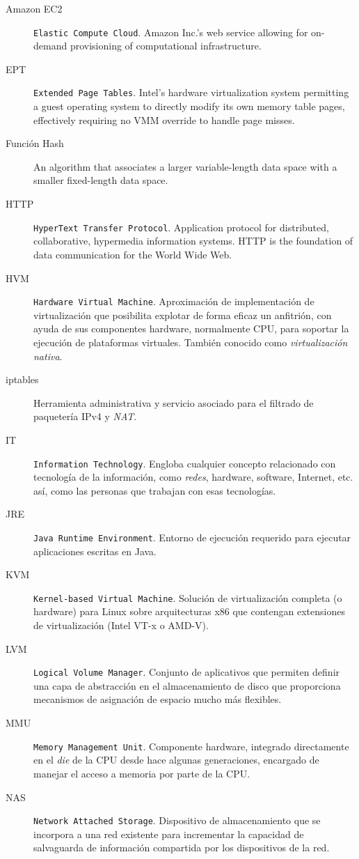 \begin{description}
\item[Amazon EC2] \texttt{Elastic Compute Cloud}. Amazon Inc.'s web service allowing for on-demand provisioning of computational infrastructure.
\item[EPT] \texttt{Extended Page Tables}. Intel's hardware virtualization system permitting a guest operating system to directly modify its own memory table pages, effectively requiring no VMM override to handle page misses.
\item[Funci\'on Hash] An algorithm that associates a larger variable-length data space with a smaller fixed-length data space.
\item[HTTP] \texttt{HyperText Transfer Protocol}. Application protocol for distributed, collaborative, hypermedia information systems. HTTP is the foundation of data communication for the World Wide Web.
\item[HVM] \texttt{Hardware Virtual Machine}. Aproximaci\'on de implementaci\'on de virtualizaci\'on que posibilita explotar de forma eficaz un anfitri\'on, con ayuda de sus componentes hardware, normalmente CPU, para soportar la ejecuci\'on de plataformas virtuales. Tambi\'en conocido como \emph{vir\-tua\-li\-za\-ci\'on nativa}.
\item[iptables] Herramienta administrativa y servicio asociado para el filtrado de paqueter\'ia IPv4 y \emph{NAT}.
\item[IT] \texttt{Information Technology}. Engloba cualquier concepto relacionado con tecnolog\'ia de la informaci\'on, como \emph{redes}, hardware, software, Internet, etc. as\'i, como las personas que trabajan con esas tecnolog\'ias.
\item[JRE] \texttt{Java Runtime Environment}. Entorno de ejecuci\'on requerido para ejecutar aplicaciones escritas en Java.
\item[KVM] \texttt{Kernel-based Virtual Machine}. Soluci\'on de virtualizaci\'on completa (o hardware) para Linux sobre arquitecturas x86 que contengan extensiones de virtualizaci\'on (Intel VT-x o AMD-V).
\item[LVM] \texttt{Logical Volume Manager}. Conjunto de aplicativos que permiten de\-fi\-nir una capa de abstracci\'on en el almacenamiento de disco que proporciona mecanismos de asignaci\'on de espacio mucho m\'as flexibles.
\item[MMU] \texttt{Memory Management Unit}. Componente hardware, integrado directamente en el \emph{die} de la CPU desde hace algunas generaciones, encargado de manejar el acceso a memoria por parte de la CPU.
\item[NAS] \texttt{Network Attached Storage}. Dispositivo de almacenamiento que se incorpora a una red existente para incrementar la capacidad de salvaguarda de informaci\'on compartida por los dispositivos de la red.

\end{description}
